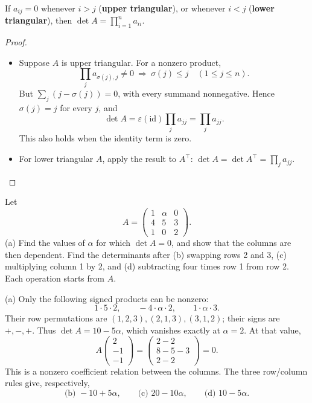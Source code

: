 \begin{proposition}\label{prop:05:triangular}
If \(a_{ij}=0\) whenever \(i>j\) (\textbf{upper triangular}), or
whenever \(i<j\) (\textbf{lower triangular}), then
\(\det A=\prod_{i=1}^n a_{ii}\).
\end{proposition}
\begin{proof}
\begin{itemize}
\item Suppose \(A\) is upper triangular. For a nonzero product,
  \[
  \prod_j a_{\sigma(j),j}\ne0
  \ \Longrightarrow\ \sigma(j)\leqslant j\quad(1\leqslant j\leqslant n).
  \]
  But \(\sum_j(j-\sigma(j))=0\), with every summand nonnegative.
  Hence \(\sigma(j)=j\) for every \(j\), and
  \[
  \det A=\varepsilon(\mathrm{id})\prod_j a_{jj}=\prod_j a_{jj}.
  \]
  This also holds when the identity term is zero.
\item For lower triangular \(A\), apply the result to \(A^\top\):
  \(\det A=\det A^\top=\prod_j a_{jj}\).
\end{itemize}
\end{proof}

\begin{example}\label{example:05:parameter}
Let
\[
A=\begin{pmatrix}1&\alpha&0\\4&5&3\\1&0&2\end{pmatrix}.
\]
(a) Find the values of \(\alpha\) for which \(\det A=0\), and show
that the columns are then dependent.
Find the determinants after (b) swapping rows 2 and 3,
(c) multiplying column 1 by 2, and (d) subtracting four times
row 1 from row 2. Each operation starts from \(A\).
\par\smallskip
{}
(a) Only the following signed products can be nonzero:
\[
1\cdot5\cdot2,\qquad -4\cdot\alpha\cdot2,\qquad
1\cdot\alpha\cdot3.
\]
Their row permutations are \((1,2,3),(2,1,3),(3,1,2)\);
their signs are \(+,-,+\). Thus \(\det A=10-5\alpha\),
which vanishes exactly at \(\alpha=2\).
At that value,
\[
A\begin{pmatrix}2\\-1\\-1\end{pmatrix}
=\begin{pmatrix}2-2\\8-5-3\\2-2\end{pmatrix}=0.
\]
This is a nonzero coefficient relation between the columns.
The three row/column rules give, respectively,
\[
\text{(b) }-10+5\alpha,\qquad
\text{(c) }20-10\alpha,\qquad
\text{(d) }10-5\alpha.
\]
\end{example}

